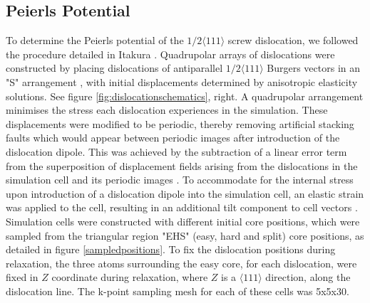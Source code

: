 \documentclass[a4paper,11pt]{article}
\begin{document}
\subsection{Peierls Potential}
\label{sec:orgf0e97b8}

To determine the Peierls potential of the \(1/2\langle 111 \rangle\) screw dislocation, we followed the
procedure detailed in Itakura \cite{Itakura2012}. Quadrupolar arrays of dislocations were
constructed by placing dislocations of antiparallel \(1/2\langle 111\rangle\) Burgers vectors in an "S"
arrangement \cite{Clouet2012}, with initial displacements determined by anisotropic elasticity
solutions. See figure \ref{fig:dislocationschematics}, right. A quadrupolar arrangement minimises
the stress each dislocation experiences in the simulation. These displacements were modified to
be periodic, thereby removing artificial stacking faults which would appear between periodic
images after introduction of the dislocation dipole. This was achieved by the subtraction of a
linear error term from the superposition of displacement fields arising from the dislocations in
the simulation cell and its periodic images \cite{vasilybulatov2006}. To accommodate for the
internal stress upon introduction of a dislocation dipole into the simulation cell, an elastic
strain was applied to the cell, resulting in an additional tilt component to cell vectors
\cite{Clouet2012,vasilybulatov2006}. Simulation cells were constructed with different initial core
positions, which were sampled from the triangular region "EHS" (easy, hard and split) core
positions, as detailed in figure \ref{sampledpositions}. To fix the dislocation positions during
relaxation, the three atoms surrounding the easy core, for each dislocation, were fixed in \(Z\)
coordinate during relaxation, where \(Z\) is a \(\langle 111 \rangle\) direction, along the dislocation line. The
k-point sampling mesh for each of these cells was 5x5x30.
\end{document}
